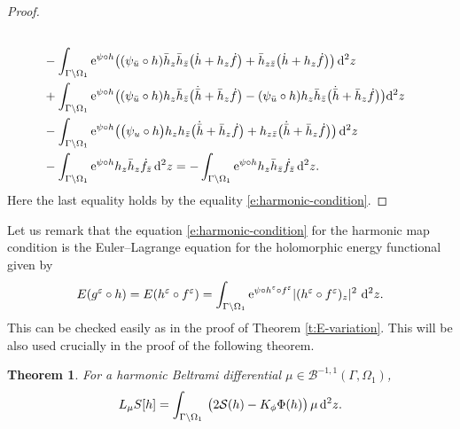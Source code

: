 \documentclass[10pt,a4paper]{amsart}
\numberwithin{equation}{section}
\newtheorem{Theorem}{Theorem}[section]
\newcommand{\vep}{\varepsilon}
\begin{document}
\begin{proof}
\begin{align*}
\\
&-\int_{\Gamma\backslash \Omega_1}{\rm e}^{\psi\circ h} \big((\psi_{\bar{u}}\circ h) \bar{h}_z \bar{h}_{\bar{z}} \big(\dot{h}+h_z \dot{f} \big) + \bar{h}_{z\bar{z}} \big(\dot{h} +h_{z} \dot{f}\big)\big)\, {\rm d}^2z
\\
&+ \int_{\Gamma\backslash \Omega_1} {\rm e}^{\psi\circ h} \big( (\psi_{\bar{u}}\circ h)h_z \bar{h}_{\bar{z}} \big(\dot{\bar{h}}+\bar{h}_z \dot{f} \big) - (\psi_{\bar{u}}\circ h)h_z \bar{h}_{\bar{z}} \big(\dot{\bar{h}}+\bar{h}_z \dot{f} \big) \big) {\rm d}^2z
\\
&-\int_{\Gamma\backslash \Omega_1} {\rm e}^{\psi\circ h} \big( \big(\psi_{{u}}\circ h\big)h_z {h}_{\bar{z}} \big(\dot{\bar{h}}+\bar{h}_z \dot{f} \big)
+h_{z\bar{z}}\big(\dot{\bar{h}} +\bar{h}_{z} \dot{f}\big) \big)\, {\rm d}^2z
\\
&-\int_{\Gamma\backslash \Omega_1} {\rm e}^{\psi\circ h} h_z \bar{h}_{{z}} \dot{f}_{\bar{z}} \, {\rm d}^2z
=- \int_{\Gamma\backslash \Omega_1} {\rm e}^{\psi\circ h} h_z \bar{h}_{\bar{z}}\dot{f}_{\bar{z}} \, {\rm d}^2z.
\end{align*}
Here the last equality holds by the equality \eqref{e:harmonic-condition}.
\end{proof}

Let us remark that the equation \eqref{e:harmonic-condition} for the harmonic map condition is the Euler--Lagrange equation for the holomorphic energy functional given by
\begin{gather*}
E(g^\vep\circ h)=E(h^\vep\circ f^\vep) = \int_{\Gamma\backslash \Omega_1} {\rm e}^{\psi\circ h^\vep \circ f^\vep} |(h^\vep \circ f^\vep)_z|^2 \ {\rm d}^2z.
\end{gather*}
This can be checked easily as in the proof of Theorem \ref{t:E-variation}.
This will be also used crucially in the proof of the following theorem.


\begin{Theorem}\label{t:final-thm}
For a harmonic Beltrami differential $\mu\in\mathcal{B}^{-1,1}(\Gamma,\Omega_1)$,
\begin{gather}\label{e:variation-S-h}
L_\mu S[h] = \int_{\Gamma\backslash \Omega_1} \, \big(2\mathcal{S}(h) - K_\phi \Phi(h) \big)\, \mu \, {\rm d}^2z.
\end{gather}
\end{Theorem}
\end{document}
